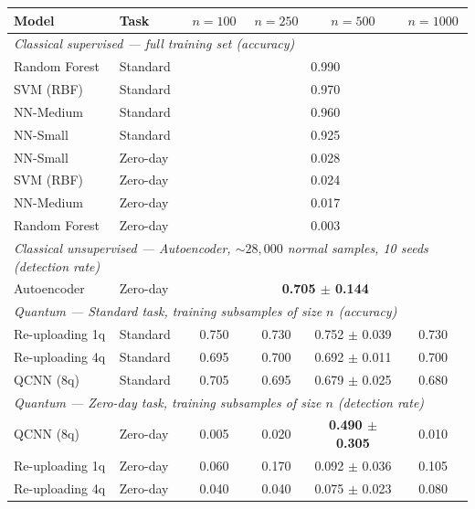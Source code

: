 \begin{table}[ht]
\centering
\small
\begin{tabular}{llcccc}
    \toprule
    \textbf{Model} & \textbf{Task} & $n=100$ & $n=250$ & $n=500$ & $n=1000$ \\
    \midrule
    \multicolumn{6}{l}{\textit{Classical supervised --- full training set (accuracy)}} \\
    \midrule
    Random Forest   & Standard  & \multicolumn{4}{c}{0.990} \\
    SVM (RBF)       & Standard  & \multicolumn{4}{c}{0.970} \\
    NN-Medium       & Standard  & \multicolumn{4}{c}{0.960} \\
    NN-Small        & Standard  & \multicolumn{4}{c}{0.925} \\
    \midrule
    NN-Small        & Zero-day  & \multicolumn{4}{c}{0.028} \\
    SVM (RBF)       & Zero-day  & \multicolumn{4}{c}{0.024} \\
    NN-Medium       & Zero-day  & \multicolumn{4}{c}{0.017} \\
    Random Forest   & Zero-day  & \multicolumn{4}{c}{0.003} \\
    \midrule
    \multicolumn{6}{l}{\textit{Classical unsupervised --- Autoencoder, ${\sim}28{,}000$ normal samples, 10 seeds (detection rate)}} \\
    \midrule
    Autoencoder     & Zero-day  & \multicolumn{4}{c}{\textbf{0.705 $\pm$ 0.144}} \\
    \midrule
    \multicolumn{6}{l}{\textit{Quantum --- Standard task, training subsamples of size $n$ (accuracy)}} \\
    \midrule
    Re-uploading 1q & Standard  & 0.750 & 0.730 & 0.752 $\pm$ 0.039 & 0.730 \\
    Re-uploading 4q & Standard  & 0.695 & 0.700 & 0.692 $\pm$ 0.011 & 0.700 \\
    QCNN (8q)       & Standard  & 0.705 & 0.695 & 0.679 $\pm$ 0.025 & 0.680 \\
    \midrule
    \multicolumn{6}{l}{\textit{Quantum --- Zero-day task, training subsamples of size $n$ (detection rate)}} \\
    \midrule
    QCNN (8q)       & Zero-day  & 0.005 & 0.020 & \textbf{0.490 $\pm$ 0.305} & 0.010 \\
    Re-uploading 1q & Zero-day  & 0.060 & 0.170 & 0.092 $\pm$ 0.036 & 0.105 \\
    Re-uploading 4q & Zero-day  & 0.040 & 0.040 & 0.075 $\pm$ 0.023 & 0.080 \\

\end{tabular}
\end{table}
